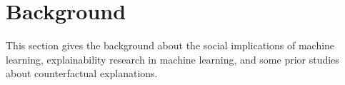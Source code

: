 \section{Background}
\label{sec:background}
This section gives the background about the social implications of machine learning, explainability research in machine learning, and some prior studies about counterfactual explanations. 





